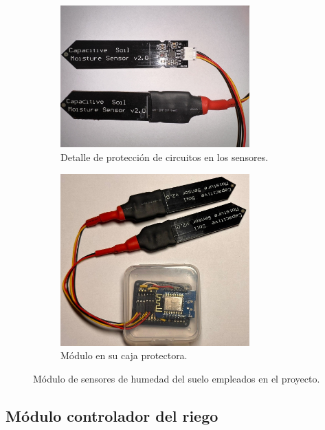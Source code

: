 \begin{figure}[!h]
\begin{subfigure}[b]{0.45\textwidth}
	\centering
		\includegraphics[width=0.80\textwidth]{./Figures/soil_compare.jpg}
		\caption[Detalle de protección de circuitos en los sensores]{Detalle de protección de circuitos en los sensores.}
		\label{fig:soil3}
     \end{subfigure}	
			\begin{subfigure}[b]{0.45\textwidth}
	\centering
		\includegraphics[width=0.80\textwidth]{./Figures/soil3.jpg}
		\caption[Módulo en su caja protectora]{Módulo en su caja protectora.}
		\label{fig:soil4}
     \end{subfigure}
     \hfill
        \caption[Módulos de sensores de humedad del suelo  empleados en el proyecto]{Módulo de sensores de humedad del suelo  empleados en el proyecto.}
        \label{fig:soilsenors}
\end{figure}


\pagebreak

\subsection{Módulo controlador del riego}
\label{Hardware módulo controlador del riego}

